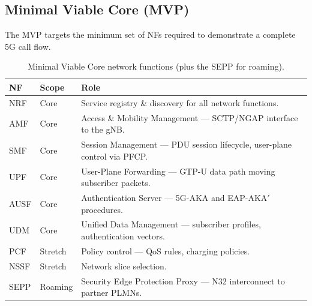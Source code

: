 \documentclass[11pt,a4paper]{report}
\newcommand{\nf}[1]{\textsc{#1}}
\begin{document}
\subsection{Minimal Viable Core (MVP)}
The MVP targets the minimum set of NFs required to demonstrate a complete 5G call flow.

\begin{table}[h]
\centering
\renewcommand{\arraystretch}{1.2}
\begin{tabularx}{\linewidth}{@{}l l X@{}}
\toprule
\textbf{NF} & \textbf{Scope} & \textbf{Role}\\
\midrule
\nf{NRF}  & Core    & Service registry \& discovery for all network functions.\\
\nf{AMF}  & Core    & Access \& Mobility Management --- SCTP/NGAP interface to the gNB.\\
\nf{SMF}  & Core    & Session Management --- PDU session lifecycle, user-plane control via PFCP.\\
\nf{UPF}  & Core    & User-Plane Forwarding --- GTP-U data path moving subscriber packets.\\
\nf{AUSF} & Core    & Authentication Server --- 5G-AKA and EAP-AKA$'$ procedures.\\
\nf{UDM}  & Core    & Unified Data Management --- subscriber profiles, authentication vectors.\\
\nf{PCF}  & Stretch & Policy control --- QoS rules, charging policies.\\
\nf{NSSF} & Stretch & Network slice selection.\\
\nf{SEPP} & Roaming & Security Edge Protection Proxy --- N32 interconnect to partner PLMNs.\\
\bottomrule
\end{tabularx}
\caption{Minimal Viable Core network functions (plus the SEPP for roaming).}
\label{tab:nfs}
\end{table}
\end{document}
